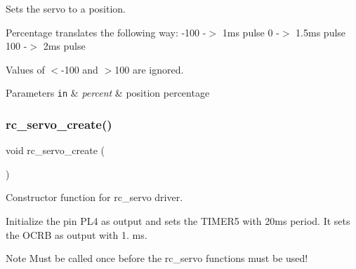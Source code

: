 Sets the servo to a position. 

Percentage translates the following way\+: -\/100 -\/$>$ 1ms pulse 0 -\/$>$ 1.\+5ms pulse 100 -\/$>$ 2ms pulse

Values of $<$-\/100 and $>$100 are ignored.


\begin{DoxyParams}[1]{Parameters}
\mbox{\tt in}  & {\em percent} & position percentage \\
\hline
\end{DoxyParams}
\mbox{\label{group__rc__servo_ga5ff21bd667dd34d74d363cb84d8d6626}} 
\subsubsection{\texorpdfstring{rc\+\_\+servo\+\_\+create()}{rc\_servo\_create()}}
{\footnotesize\ttfamily void rc\+\_\+servo\+\_\+create (\begin{DoxyParamCaption}{ }\end{DoxyParamCaption})}



Constructor function for rc\+\_\+servo driver. 

Initialize the pin P\+L4 as output and sets the T\+I\+M\+E\+R5 with 20ms period. It sets the O\+C\+RB as output with 1. ms.

\begin{DoxyNote}{Note}
Must be called once before the rc\+\_\+servo functions must be used! 
\end{DoxyNote}
